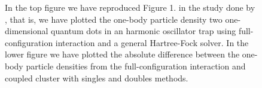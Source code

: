 \begin{figure}
                \caption{In the top figure we have reproduced Figure 1. in the
                study done by \citeauthor{zanghellini_2004}
                \cite{zanghellini_2004}, that is, we have plotted the one-body
                particle density two one-dimensional quantum dots in an harmonic
                oscillator trap using full-configuration interaction and a
                general Hartree-Fock solver.
                In the lower figure we have plotted the absolute difference
                between the one-body particle densities from the
                full-configuration interaction and coupled cluster with singles
                and doubles methods.}
                \label{fig:one-body-density-zanghellini}
             \end{figure}

